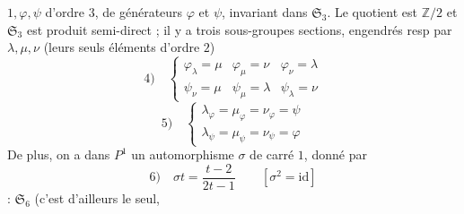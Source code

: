 $1,\varphi,\psi$  d'ordre $3$, de générateurs $\varphi$ et $\psi$, invariant dans $\mathfrak S_3$. Le quotient est $\mathbb Z/2$ et $\mathfrak S_3$ est produit semi-direct ; il y a trois sous-groupes sections, engendrés resp par $\lambda,\mu,\nu$ (leurs seuls éléments d'ordre $2$)
\[
4)\quad\left\{\begin{array}{lll}\varphi_\lambda=\mu&\varphi_\mu=\nu&\varphi_\nu=\lambda\\\psi_\nu=\mu&\psi_\mu=\lambda&\psi_\lambda=\nu\end{array}\right.
\]
\[
5)\quad\left\{\begin{array}{l}\lambda_\varphi=\mu_\varphi=\nu_\varphi=\psi\\\lambda_\psi=\mu_\psi=\nu_\psi=\varphi\end{array}\right.
\]
De plus, on a dans $P^1$ un automorphisme $\sigma$  de carré $1$, donné par
\[
6)\quad\sigma t=\frac{t-2}{2t-1}\qquad[\sigma^2=\mathrm{id}]
\]
 : $\mathfrak S_6$ (c'est d'ailleurs le seul, 
